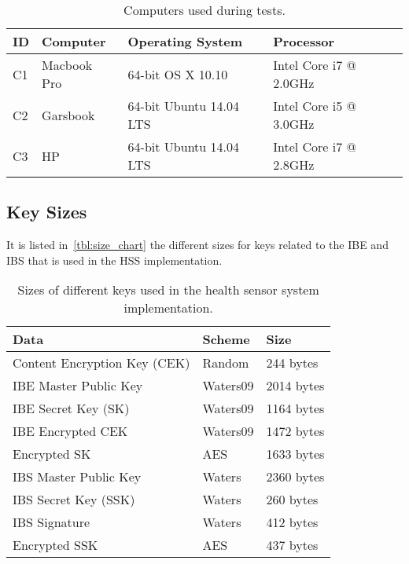 \begin{table}[h]
  \begin{tabular}{llll}
  ID      & Computer                  & Operating System          & Processor                    \\ \hline
  C1      & Macbook Pro               & 64-bit OS X 10.10         & Intel Core i7 @ 2.0GHz       \\ %
  C2      & Garsbook                  & 64-bit Ubuntu 14.04 LTS   & Intel Core i5 @ 3.0GHz       \\ %
  C3      & HP                        & 64-bit Ubuntu 14.04 LTS   & Intel Core i7 @ 2.8GHz       \\ %
  \end{tabular}
  \caption{Computers used during tests.}
  \label{tbl:target_computers}
\end{table}

\subsection{Key Sizes}
It is listed in~\autoref{tbl:size_chart} the different sizes for keys related to the \gls{IBE} and \gls{IBS} that is used in the \gls{HSS} implementation.

\begin{table}[h]
  \begin{tabular}{lll}
  Data                            & Scheme          & Size              \\ \hline
  Content Encryption Key (CEK)    & Random          & 244 bytes         \\ %
  IBE Master Public Key           & Waters09        & 2014 bytes        \\ %
  IBE Secret Key (SK)             & Waters09        & 1164 bytes        \\ %
  IBE Encrypted CEK               & Waters09        & 1472 bytes        \\ %
  Encrypted SK                    & AES             & 1633 bytes        \\ %
  IBS Master Public Key           & Waters          & 2360 bytes        \\ %
  IBS Secret Key (SSK)            & Waters          & 260 bytes         \\ %
  IBS Signature                   & Waters          & 412 bytes         \\ %
  Encrypted SSK                   & AES             & 437 bytes         \\ %
  \end{tabular}
  \caption{Sizes of different keys used in the health sensor system implementation.}
  \label{tbl:size_chart}
\end{table}


